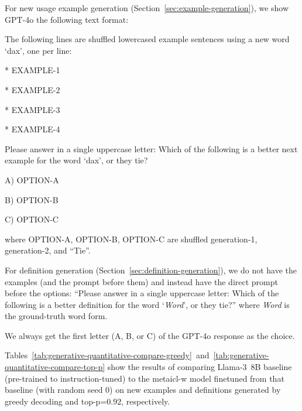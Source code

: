 \documentclass{article}
\begin{document}
For new usage example generation (Section~\ref{sec:example-generation}), we show \mbox{GPT-4o} the following text format:
\begin{displayquote}
The following lines are shuffled lowercased example sentences using a new word `dax', one per line:

* EXAMPLE-1

* EXAMPLE-2

* EXAMPLE-3

* EXAMPLE-4

Please answer in a single uppercase letter: Which of the following is a better next example for the word `dax', or they tie?

A) OPTION-A

B) OPTION-B

C) OPTION-C
\end{displayquote}
where OPTION-A, OPTION-B, OPTION-C are shuffled generation-1, generation-2, and ``Tie''.

For definition generation (Section~\ref{sec:definition-generation}), we do not have the examples (and the prompt before them) and instead have the direct prompt before the options: ``Please answer in a single uppercase letter: Which of the following is a better definition for the word `\textit{Word}', or they tie?'' where \textit{Word} is the ground-truth word form.

We always get the first letter (A, B, or C) of the \mbox{GPT-4o} response as the choice.

Tables~\ref{tab:generative-quantitative-compare-greedy}~and~\ref{tab:generative-quantitative-compare-top-p} show the results of comparing \mbox{Llama-3 8B} baseline (pre-trained to instruction-tuned) to the \ac{metaicl-w} model finetuned from that baseline (with random seed 0) on new examples and definitions generated by greedy decoding and top-p=$0.92$, respectively.
\end{document}
